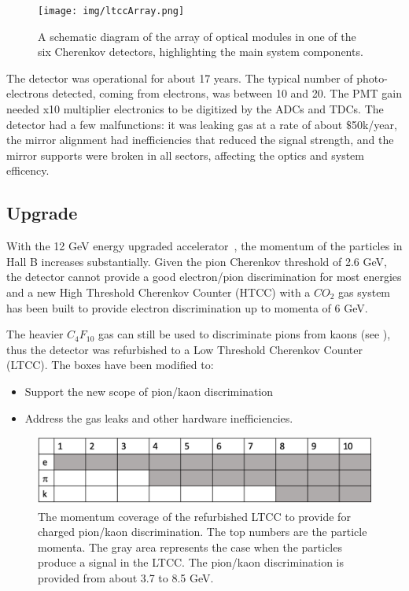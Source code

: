 \begin{figure}[ht]
	\centering
	\texttt{[image: img/ltccArray.png]}
	\caption{A schematic diagram of the array of optical modules in one of the six Cherenkov detectors, highlighting the main system components.}
	\label{fig:ltccArray}
\end{figure}

The detector was operational for about 17 years. The typical number of photo-electrons detected, coming from electrons, was between 10 and 20.
The PMT gain needed x10 multiplier electronics to be digitized by the ADCs and TDCs.
The detector had a few malfunctions: it was leaking gas at a rate of about $\$$50k/year, the mirror alignment had inefficiencies that reduced
the signal strength, and the mirror supports were broken in all sectors, affecting the optics and system efficency.


\subsection{Upgrade}

With the 12 GeV energy upgraded accelerator~\cite{TDR12}, the momentum of the particles in Hall B increases substantially.
Given the pion Cherenkov threshold of 2.6 GeV, the detector cannot provide a good electron/pion discrimination for most energies and a new
High Threshold Cherenkov Counter (HTCC) with a $CO_2$ gas system has been built to provide electron discrimination up to momenta of 6 GeV.

The heavier $C_4F_{10}$ gas can still be used to discriminate pions from kaons (see ), thus the detector was refurbished
to a Low Threshold Cherenkov Counter (LTCC).
The boxes have been modified to:

\begin{itemize}
	\item Support the new scope of pion/kaon discrimination
	\item Address the gas leaks and other hardware inefficiencies.
\end{itemize}

\begin{figure}[hb]
	\centering
	\includegraphics[width=0.95\columnwidth,keepaspectratio]{img/newScope.png}
	\caption{The momentum coverage of the refurbished LTCC to provide for charged pion/kaon discrimination.
             The top numbers are the particle momenta.
		     The gray area represents the case when the particles produce a signal in the LTCC.
			 The pion/kaon discrimination is provided from about 3.7 to 8.5 GeV.}
	\label{fig:newScope}
\end{figure}
